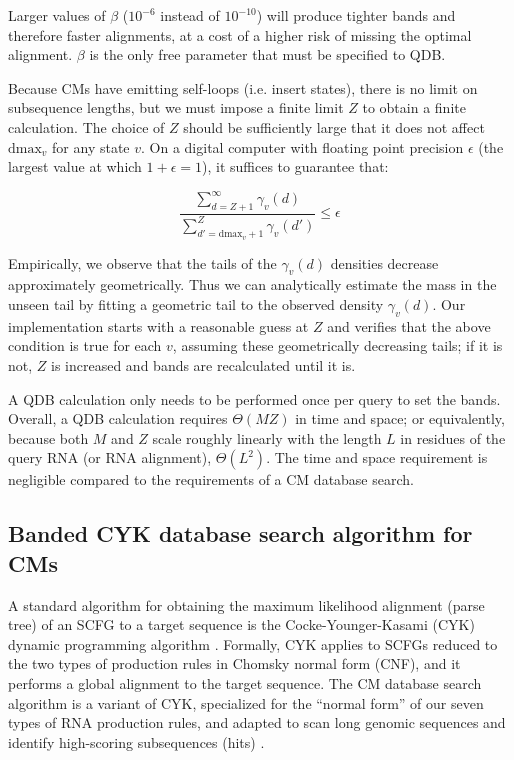 \documentclass[11pt]{article}
\begin{document}
Larger values of $\beta$ ($10^{-6}$ instead of $10^{-10}$) will
produce tighter bands and therefore faster alignments, at a cost of a
higher risk of missing the optimal alignment. $\beta$ is the only free
parameter that must be specified to QDB.

Because CMs have emitting self-loops (i.e. insert states), there is no
limit on subsequence lengths, but we must impose a finite limit $Z$ to
obtain a finite calculation.  The choice of $Z$ should be sufficiently
large that it does not affect $\mbox{dmax}_v$ for any state $v$.  On a
digital computer with floating point precision $\epsilon$ (the largest
value at which $1+\epsilon = 1$), it suffices to guarantee that:

\[
  \frac{ \sum_{d = Z+1}^{\infty}  \gamma_v(d)}
       { \sum_{d' = \mbox{dmax}_v + 1}^{Z} \gamma_v(d')}  \leq \epsilon
\]

Empirically, we observe that the tails of the $\gamma_v(d)$ densities
decrease approximately geometrically. Thus we can analytically
estimate the mass in the unseen tail by fitting a geometric tail to
the observed density $\gamma_v(d)$. Our implementation starts with a
reasonable guess at $Z$ and verifies that the above condition is true
for each $v$, assuming these geometrically decreasing tails; if it is
not, $Z$ is increased and bands are recalculated until it is.

A QDB calculation only needs to be performed once per query to set the
bands. Overall, a QDB calculation requires $\Theta(MZ)$ in time and
space; or equivalently, because both $M$ and $Z$ scale roughly
linearly with the length $L$ in residues of the query RNA (or RNA
alignment), $\Theta(L^2)$. The time and space requirement is
negligible compared to the requirements of a CM database search.

\subsection{Banded CYK database search algorithm for CMs}

A standard algorithm for obtaining the maximum likelihood alignment
(parse tree) of an SCFG to a target sequence is the
Cocke-Younger-Kasami (CYK) dynamic programming algorithm
\cite{Kasami65, Younger67, HopcroftUllman79}. Formally, CYK applies to
SCFGs reduced to the two types of production rules in Chomsky normal
form (CNF), and it performs a global alignment to the target sequence.
The CM database search algorithm is a variant of CYK, specialized for
the ``normal form'' of our seven types of RNA production rules, and
adapted to scan long genomic sequences and identify high-scoring
subsequences (hits) \cite{Durbin98}. 
\end{document}
